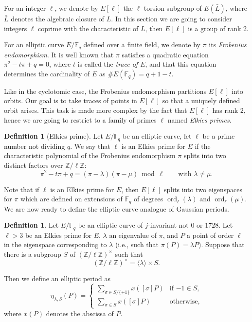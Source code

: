 \documentclass[12pt]{article}
\theoremstyle{plain}
\theoremstyle{definition}
\newtheorem{definition}[theorem]{Definition}
\DeclareMathOperator{\order}{ord} %
\def\Z{\ensuremath{\mathbb{Z}}}
\def\F{\ensuremath{\mathbb{F}}}
\begin{document}
For an integer $\ell$, we denote by $E[\ell]$ the $\ell$-torsion
subgroup of $E(\bar{L})$, where $\bar{L}$ denotes the algebraic
closure of $L$. In this section we are going to consider integers
$\ell$ coprime with the characteristic of $L$, then $E[\ell]$ is a
group of rank $2$.

For an elliptic curve $E/\F_q$ defined over a finite field, we denote
by $\pi$ its \emph{Frobenius endomorphism}. It is well known that
$\pi$ satisfies a quadratic equation $\pi^2-t\pi+q=0$, where $t$ is
called the \emph{trace of $E$}, and that this equation determines the
cardinality of $E$ as $\#E(\F_q)=q+1-t$.

Like in the cyclotomic case, the Frobenius endomorphism partitions
$E[\ell]$ into orbits. Our goal is to take traces of points in
$E[\ell]$ so that a uniquely defined orbit arises. This task is made
more complex by the fact that $E[\ell]$ has rank 2, hence we are going
to restrict to a family of primes $\ell$ named \emph{Elkies primes}.

\begin{definition}[Elkies prime]
  Let $E/\F_q$ be an elliptic curve, let $\ell$ be a prime number not
  dividing $q$.  We say that $\ell$ is an Elkies prime for $E$ if the
  characteristic polynomial of the Frobenius endomorphism $\pi$ splits
  into two distinct factors over $\Z/\ell\Z$:
\begin{equation}
\pi^2-t\pi+q=(\pi-\lambda)(\pi-\mu)\bmod\ell
\qquad\text{with $\lambda\ne\mu$}.
\end{equation}
\end{definition}

Note that if $\ell$ is an Elkies prime for $E$, then $E[\ell]$ splits
into two eigenspaces for $\pi$ which are defined on extensions of
$\F_q$ of degrees $\order_\ell(\lambda)$ and $\order_\ell(\mu)$. We
are now ready to define the elliptic curve analogue of Gaussian
periods.

\begin{definition}
  \label{definition:ellperiod}
  Let $E/\F_q$ be an elliptic curve of $j$-invariant not $0$ or
  $1728$. %
  Let $\ell > 3$ be an Elkies prime for $E$, $\lambda$ an eigenvalue
  of $\pi$, and $P$ a point of order $\ell$ in the eigenspace
  corresponding to $\lambda$ (i.e., such that $\pi(P)=\lambda P$).
  Suppose that there is a subgroup $S$ of $(\Z/\ell\Z)^{\times}$ such
  that
  \begin{equation}
    (\Z/\ell\Z)^{\times} = \langle{\lambda}\rangle \times S.
  \end{equation}
  
  Then we define an elliptic period as
  \begin{equation}
    \eta_{\lambda,S}(P) =
    \begin{cases}
      \sum_{\sigma\in S/\{\pm1\}} {x \left([\sigma] P \right)} & \text{if $-1\in S$,}\\
      \sum_{\sigma\in S} {x \left([\sigma] P \right)} & \text{otherwise,}
    \end{cases}
  \end{equation}
  where $x(P)$ denotes the abscissa of $P$.
\end{definition}
\end{document}
